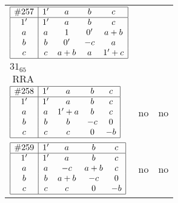 \documentclass[12pt]{article}
\theoremstyle{definition}
\newcommand\RRA{\operatorname{RRA}}
\newcommand{\join}{\mathbin{+}}%
\newcommand{\id}{{1'}}%
\renewcommand{\div}{0'}
\renewcommand{\top}{1}%
\begin{document}
\begin{center}
\begin{longtable}{l|c|c}
$
\begin{array}{|c|cccc|} \hline
\#257 & \id & a & b & c \\ \hline
\id & \id & a & b & c \\
a & a & \top & \div & a \join b \\
b & b & \div & -c & a \\
c & c & a \join b & a & \id \join c \\ \hline
\end{array}
$
 & \begin{tabular}{c} yes \\ $31_{65}$ \\ $\RRA$ \end{tabular} 
 & \adjustbox{valign=c, max height=1.6cm}{$
\left[ \begin{array}{cccccc}
\id & a & a & b & a & b \\ 
a & \id & a & a & c & c \\ 
a & a & \id & b & b & a \\ 
b & a & b & \id & a & b \\ 
a & c & b & a & \id & c \\ 
b & c & a & b & c & \id
\end{array}\right]
$}
      \\[15mm]

$
\begin{array}{|c|cccc|} \hline
\#258 & \id & a & b & c \\ \hline
\id & \id & a & b & c \\
a & a & \id \join a & b & c \\
b & b & b & -c & 0 \\
c & c & c & 0 & -b \\ \hline
\end{array}
$
 & no  
 & no     \\[15mm]

$
\begin{array}{|c|cccc|} \hline
\#259 & \id & a & b & c \\ \hline
\id & \id & a & b & c \\
a & a & -c & a \join b & c \\
b & b & a \join b & -c & 0 \\
c & c & c & 0 & -b \\ \hline
\end{array}
$
 & no  
 & no      \\[15mm]


\end{longtable}
\end{center}
\end{document}
